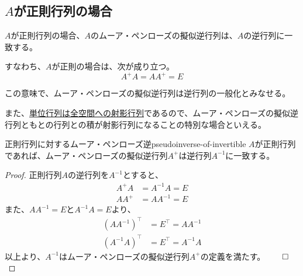 \documentclass[../../../topic_linear-algebra]{subfiles}
\begin{document}
\subsection{$A$が正則行列の場合}

$A$が正則行列の場合、$A$のムーア・ペンローズの擬似逆行列は、$A$の逆行列に一致する。

すなわち、$A$が正則の場合は、次が成り立つ。
\begin{equation*}
  A^+ A = A A^+ = E
\end{equation*}

この意味で、ムーア・ペンローズの擬似逆行列は逆行列の一般化とみなせる。

\br

また、\hyperref[sec:identity-to-projections]{単位行列は全空間への射影行列}であるので、ムーア・ペンローズの擬似逆行列ともとの行列との積が射影行列になることの特別な場合といえる。

\begin{theorem}{正則行列に対するムーア・ペンローズ逆}{pseudoinverse-of-invertible}
  $A$が正則行列であれば、ムーア・ペンローズの擬似逆行列$A^+$は逆行列$A^{-1}$に一致する。
\end{theorem}

\begin{proof}
  正則行列$A$の逆行列を$A^{-1}$とすると、
  \begin{align*}
    A^+ A &= A^{-1} A = E \\
    A A^+ &= A A^{-1} = E
  \end{align*}
  また、$AA^{-1} = E$と$A^{-1}A = E$より、
  \begin{align*}
    (AA^{-1})^\top & = E^\top = AA^{-1} \\
    (A^{-1}A)^\top & = E^\top = A^{-1}A
  \end{align*}
  以上より、$A^{-1}$はムーア・ペンローズの擬似逆行列$A^+$の定義を満たす。$\qed$
\end{proof}
\end{document}
